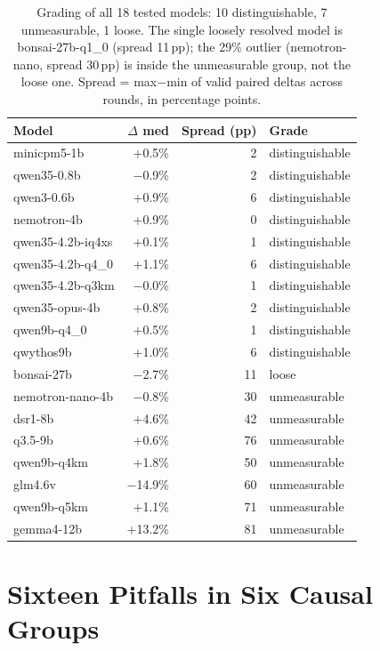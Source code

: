 \documentclass[letterpaper,twocolumn,10pt]{article}
\begin{document}
\begin{table}[t]
\centering
\footnotesize
\setlength{\tabcolsep}{3pt}
\begin{tabular}{@{}lrrl@{}}
\toprule
Model & $\Delta$ med & Spread (pp) & Grade \\
\midrule
minicpm5-1b & +0.5\% & 2 & distinguishable \\
qwen35-0.8b & $-$0.9\% & 2 & distinguishable \\
qwen3-0.6b & +0.9\% & 6 & distinguishable \\
nemotron-4b & +0.9\% & 0 & distinguishable \\
qwen35-4.2b-iq4xs & +0.1\% & 1 & distinguishable \\
qwen35-4.2b-q4\_0 & +1.1\% & 6 & distinguishable \\
qwen35-4.2b-q3km & $-$0.0\% & 1 & distinguishable \\
qwen35-opus-4b & +0.8\% & 2 & distinguishable \\
qwen9b-q4\_0 & +0.5\% & 1 & distinguishable \\
qwythos9b & +1.0\% & 6 & distinguishable \\
bonsai-27b & $-$2.7\% & 11 & loose \\
nemotron-nano-4b & $-$0.8\% & 30 & unmeasurable \\
dsr1-8b & +4.6\% & 42 & unmeasurable \\
q3.5-9b & +0.6\% & 76 & unmeasurable \\
qwen9b-q4km & +1.8\% & 50 & unmeasurable \\
glm4.6v & $-$14.9\% & 60 & unmeasurable \\
qwen9b-q5km & +1.1\% & 71 & unmeasurable \\
gemma4-12b & +13.2\% & 81 & unmeasurable \\
\bottomrule
\end{tabular}
\caption{Grading of all 18 tested models: 10 distinguishable, 7 unmeasurable,
1 loose. The single loosely resolved model is bonsai-27b-q1\_0 (spread 11\,pp);
the 29\% outlier (nemotron-nano, spread 30\,pp) is inside the unmeasurable
group, not the loose one. Spread = max$-$min of valid paired deltas across
rounds, in percentage points.}
\label{tab:grade}
\end{table}

\section{Sixteen Pitfalls in Six Causal Groups}
\label{app:pits}
\end{document}
